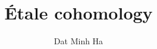 

\setcounter{section}{-1}





	\title{\'Etale cohomology}
	
	\author{Dat Minh Ha}
	\maketitle
	
	\begin{abstract}
	    
	\end{abstract}
	
	{
      \hypersetup{} 
      \tableofcontents %
    }
    
    
    
    
    
    
	
	\printbibliography

